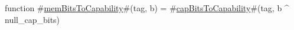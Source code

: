 function #\hyperref[zmemBitsToCapability]{memBitsToCapability}#(tag, b) =
  #\hyperref[zcapBitsToCapability]{capBitsToCapability}#(tag, b ^ null_cap_bits)
